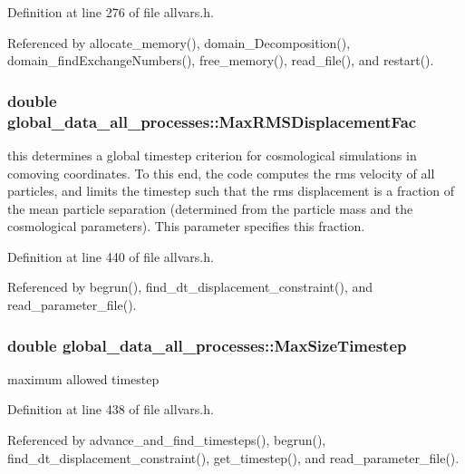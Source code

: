 Definition at line 276 of file allvars.h.



Referenced by allocate\_\-memory(), domain\_\-Decomposition(), domain\_\-findExchangeNumbers(), free\_\-memory(), read\_\-file(), and restart().

\hypertarget{structglobal__data__all__processes_a988ecf1fcfe5e61ff9ac29792c816c24}{
\subsubsection[{MaxRMSDisplacementFac}]{\setlength{\rightskip}{0pt plus 5cm}double {\bf global\_\-data\_\-all\_\-processes::MaxRMSDisplacementFac}}}
\label{structglobal__data__all__processes_a988ecf1fcfe5e61ff9ac29792c816c24}
this determines a global timestep criterion for cosmological simulations in comoving coordinates. To this end, the code computes the rms velocity of all particles, and limits the timestep such that the rms displacement is a fraction of the mean particle separation (determined from the particle mass and the cosmological parameters). This parameter specifies this fraction. 

Definition at line 440 of file allvars.h.



Referenced by begrun(), find\_\-dt\_\-displacement\_\-constraint(), and read\_\-parameter\_\-file().

\hypertarget{structglobal__data__all__processes_a7303c9f6c34ee3befcac84043c8ec3ea}{
\subsubsection[{MaxSizeTimestep}]{\setlength{\rightskip}{0pt plus 5cm}double {\bf global\_\-data\_\-all\_\-processes::MaxSizeTimestep}}}
\label{structglobal__data__all__processes_a7303c9f6c34ee3befcac84043c8ec3ea}
maximum allowed timestep 

Definition at line 438 of file allvars.h.



Referenced by advance\_\-and\_\-find\_\-timesteps(), begrun(), find\_\-dt\_\-displacement\_\-constraint(), get\_\-timestep(), and read\_\-parameter\_\-file().

